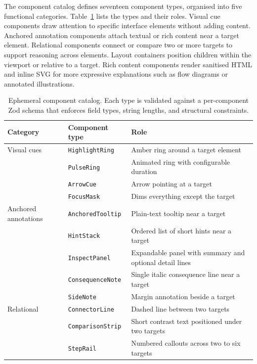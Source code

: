 The component catalog defines seventeen component types, organised into five functional categories. Table~\ref{tab:component-catalog} lists the types and their roles. Visual cue components draw attention to specific interface elements without adding content. Anchored annotation components attach textual or rich content near a target element. Relational components connect or compare two or more targets to support reasoning across elements. Layout containers position children within the viewport or relative to a target. Rich content components render sanitised HTML and inline SVG for more expressive explanations such as flow diagrams or annotated illustrations.

\begin{table}[t]
    \centering
    \footnotesize
    \caption{Ephemeral component catalog. Each type is validated against a per-component Zod schema that enforces field types, string lengths, and structural constraints.}
    \label{tab:component-catalog}
    \begin{tabular}{@{}p{}p{}p{}@{}}
        \toprule
        Category & Component type & Role \\
        \midrule
        Visual cues & \texttt{HighlightRing} & Amber ring around a target element \\
        & \texttt{PulseRing} & Animated ring with configurable duration \\
        & \texttt{ArrowCue} & Arrow pointing at a target \\
        & \texttt{FocusMask} & Dims everything except the target \\
        \midrule
        Anchored annotations & \texttt{AnchoredTooltip} & Plain-text tooltip near a target \\
        & \texttt{HintStack} & Ordered list of short hints near a target \\
        & \texttt{InspectPanel} & Expandable panel with summary and optional detail lines \\
        & \texttt{ConsequenceNote} & Single italic consequence line near a target \\
        & \texttt{SideNote} & Margin annotation beside a target \\
        \midrule
        Relational & \texttt{ConnectorLine} & Dashed line between two targets \\
        & \texttt{ComparisonStrip} & Short contrast text positioned under two targets \\
        & \texttt{StepRail} & Numbered callouts across two to six targets \\

\end{tabular}
\end{table}
